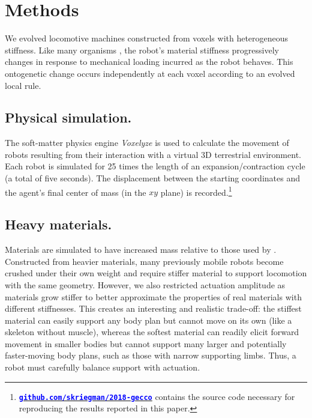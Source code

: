 \section{Methods}
\label{sec6:methods}

We evolved locomotive machines constructed from voxels with heterogeneous stiffness. 
Like many organisms \citep{ruff2006s}, the robot's material stiffness progressively changes in response to mechanical loading incurred as the robot behaves.
This ontogenetic change occurs independently at each voxel according to an evolved local rule.


\subsection*{Physical simulation.}

The soft-matter physics engine \textit{Voxelyze} \citep{hiller2014dynamic} is used to calculate the movement of robots resulting from their interaction with a virtual 3D terrestrial environment.
Each robot is simulated for 25 times the length of an expansion/contraction cycle (a total of five seconds). 
The displacement between the starting coordinates and the agent's final center of mass (in the $xy$ plane) is recorded.\footnote{\href{https://github.com/skriegman/2018-gecco}{\textcolor{blue}{\textbf{\texttt{github.com/skriegman/2018-gecco}}}} contains the source code necessary for reproducing the results reported in this paper.}




\subsection*{Heavy materials.}


Materials are simulated to have increased mass relative to those used by \cite{hiller2012automatic,cheney2013unshackling,cheney2014electro}.
Constructed from heavier materials, many previously mobile robots become crushed under their own weight and require stiffer material to support locomotion with the same geometry.
However, we also restricted actuation amplitude as materials grow stiffer to better approximate the properties of real materials with different stiffnesses.
This creates an interesting and realistic trade-off: the stiffest material can easily support any body plan but cannot move on its own (like a skeleton without muscle), whereas the softest material can readily elicit forward movement in smaller bodies but cannot support many larger and potentially faster-moving body plans, 
such as those with narrow supporting limbs.
Thus, a robot must carefully balance support with actuation.



